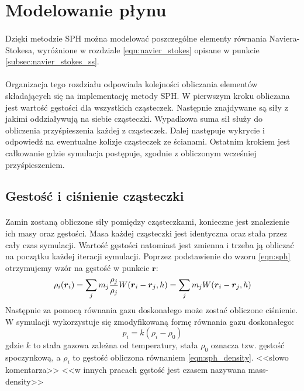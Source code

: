 \newpage

\section{Modelowanie płynu}

\paragraph{}
Dzięki metodzie SPH można modelować poszczególne elementy równania Naviera-Stokesa, wyróżnione w rozdziale \eqref{eqn:navier_stokes} opisane w punkcie \eqref{subsec:navier_stokes_ss}.
\par
\paragraph{}
\indent Organizacja tego rozdziału odpowiada kolejności obliczania elementów składających się na implementację metody SPH. W pierwszym kroku obliczana jest wartość gęstości dla wszystkich cząsteczek. Następnie znajdywane są siły z jakimi oddziaływują na siebie cząsteczki. Wypadkowa suma sił służy do obliczenia przyśpieszenia każdej z cząsteczek. Dalej następuje wykrycie i odpowiedź na ewentualne kolizje cząsteczek ze ścianami. Ostatnim krokiem jest całkowanie gdzie symulacja postępuje, zgodnie z obliczonym wcześniej przyśpieszeniem.
\par

\subsection{Gestość i ciśnienie cząsteczki}

\paragraph{}
Zamin zostaną obliczone siły pomiędzy cząsteczkami, konieczne jest znalezienie ich masy oraz gęstości. Masa każdej cząsteczki jest identyczna oraz stała przez cały czas symulacji. Wartość gęstości natomiast jest zmienna i trzeba ją obliczać na początku każdej iteracji symulacji. Poprzez podstawienie do wzoru \eqref{eqn:sph} otrzymujemy wzór na gęstość w punkcie $\boldsymbol{r}$:
\begin{equation}
\rho_i(\boldsymbol{r}_i) = \sum\limits_{j} m_j {\rho_j \over\rho_j}W(\boldsymbol{r}_i-\boldsymbol{r}_j, h) = \sum\limits_{j} m_j W(\boldsymbol{r}_i-\boldsymbol{r}_j, h)
\label{eqn:sph_density}
\end{equation}
Następnie za pomocą równania gazu doskonałego może zostać obliczone ciśnienie. W symulacji wykorzystuje się zmodyfikowaną formę równania gazu doskonałego:
\begin{equation}
p_i = k(\rho_i - \rho_0)
\label{eqn:sph_desbrun_pressure}
\end{equation}
gdzie $k$ to stała gazowa zależna od temperatury, stała $\rho_0$ oznacza tzw. gęstość spoczynkową, a $\rho_i$ to gęstość obliczona równaniem \eqref{eqn:sph_density}. <<słowo komentarza>> <<w innych pracach gęstość jest czasem nazywana mass-density>>
\par


